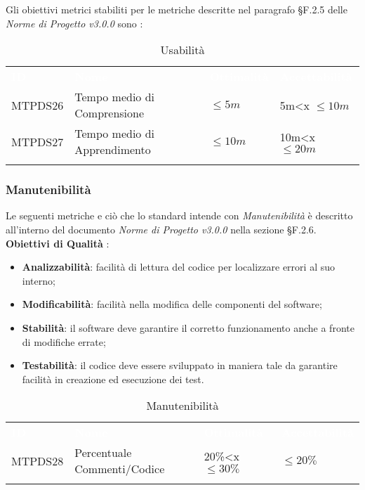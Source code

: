 Gli obiettivi metrici stabiliti per le metriche descritte nel paragrafo §F.2.5 delle \textit{Norme di Progetto v3.0.0} sono : 

\begin{longtable}{|C{.15\textwidth}|C{.24\textwidth}|C{.24\textwidth}|C{.24\textwidth}|}
\hline
{}\textbf{\textcolor{white}{ID}} & \textbf{\textcolor{white}{Nome}} & \textbf{\textcolor{white}{Ottimalità}} & \textbf{\textcolor{white}{Accettabilità}}\\
MTPDS26 & Tempo medio di Comprensione & $\leq 5m$ & 5m<x $\leq 10m$\\
\hline
{}MTPDS27 & Tempo medio di Apprendimento & $\leq 10m$ & 10m<x $\leq 20m$ \\ 
\hline
\caption{Usabilità}
\label{Usabilità}
\end{longtable}

\subsubsection{Manutenibilità}

Le seguenti metriche e ciò che lo standard intende con \textit{Manutenibilità} è descritto all'interno del documento \textit{Norme di Progetto v3.0.0} nella sezione §F.2.6. \\

\textbf{Obiettivi di Qualità} :

\begin{itemize}
	\item \textbf{Analizzabilità}: facilità di lettura del codice per localizzare errori al suo interno; 
	\item \textbf{Modificabilità}: facilità nella modifica delle componenti del software;
	\item \textbf{Stabilità}: il software deve garantire il corretto funzionamento anche a fronte di modifiche errate;
	\item \textbf{Testabilità}: il codice deve essere sviluppato in maniera tale da garantire facilità in creazione ed esecuzione dei test.
\end{itemize}

\begin{longtable}{|C{.15\textwidth}|C{.24\textwidth}|C{.24\textwidth}|C{.24\textwidth}|}
\hline
{}\textbf{\textcolor{white}{ID}} & \textbf{\textcolor{white}{Nome}} & \textbf{\textcolor{white}{Ottimalità}} & \textbf{\textcolor{white}{Accettabilità}}\\
MTPDS28 & Percentuale Commenti/Codice & 20\%<x $\leq 30\%$ & $\leq 20\%$\\
\hline

\caption{Manutenibilità}
\label{Manutenibilità}
\end{longtable}

